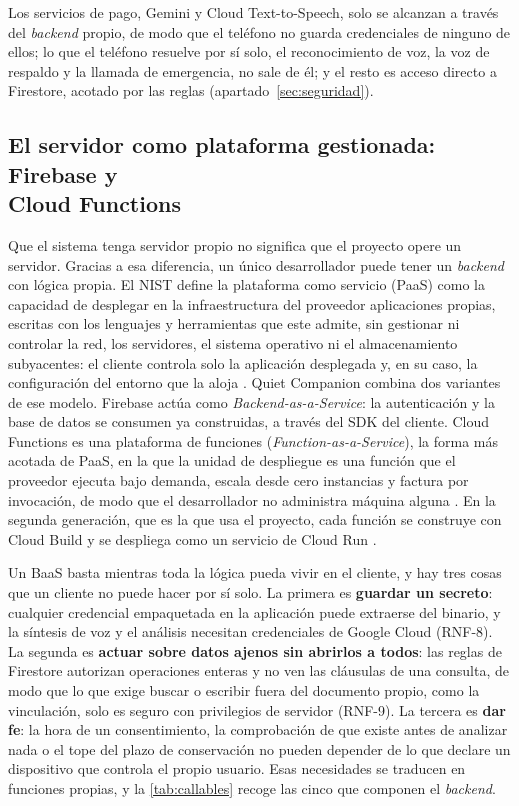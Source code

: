 Los servicios de pago, Gemini y Cloud Text-to-Speech, solo se alcanzan a través del \emph{backend} propio, de modo que el teléfono no guarda credenciales de ninguno de ellos; lo que el teléfono resuelve por sí solo, el reconocimiento de voz, la voz de respaldo y la llamada de emergencia, no sale de él; y el resto es acceso directo a Firestore, acotado por las reglas (apartado~\ref{sec:seguridad}).


\subsection[El servidor como plataforma gestionada: Firebase y Cloud Functions]{El servidor como plataforma gestionada: Firebase y\\ Cloud Functions}
\label{sec:paas}

Que el sistema tenga servidor propio no significa que el proyecto opere un servidor. Gracias a esa diferencia, un único desarrollador puede tener un \emph{backend} con lógica propia. El NIST define la plataforma como servicio (PaaS) como la capacidad de desplegar en la infraestructura del proveedor aplicaciones propias, escritas con los lenguajes y herramientas que este admite, sin gestionar ni controlar la red, los servidores, el sistema operativo ni el almacenamiento subyacentes: el cliente controla solo la aplicación desplegada y, en su caso, la configuración del entorno que la aloja \citep{NIST800145}. Quiet Companion combina dos variantes de ese modelo. Firebase actúa como \emph{Backend-as-a-Service}: la autenticación y la base de datos se consumen ya construidas, a través del SDK del cliente. Cloud Functions es una plataforma de funciones (\emph{Function-as-a-Service}), la forma más acotada de PaaS, en la que la unidad de despliegue es una función que el proveedor ejecuta bajo demanda, escala desde cero instancias y factura por invocación, de modo que el desarrollador no administra máquina alguna \citep{Jonas2019}. En la segunda generación, que es la que usa el proyecto, cada función se construye con Cloud Build y se despliega como un servicio de Cloud Run \citep{FirebaseFunctionsVersions}.

Un BaaS basta mientras toda la lógica pueda vivir en el cliente, y hay tres cosas que un cliente no puede hacer por sí solo. La primera es \textbf{guardar un secreto}: cualquier credencial empaquetada en la aplicación puede extraerse del binario, y la síntesis de voz y el análisis necesitan credenciales de Google Cloud (RNF-8). La segunda es \textbf{actuar sobre datos ajenos sin abrirlos a todos}: las reglas de Firestore autorizan operaciones enteras y no ven las cláusulas de una consulta, de modo que lo que exige buscar o escribir fuera del documento propio, como la vinculación, solo es seguro con privilegios de servidor (RNF-9). La tercera es \textbf{dar fe}: la hora de un consentimiento, la comprobación de que existe antes de analizar nada o el tope del plazo de conservación no pueden depender de lo que declare un dispositivo que controla el propio usuario. Esas necesidades se traducen en funciones propias, y la \autoref{tab:callables} recoge las cinco que componen el \emph{backend}.

